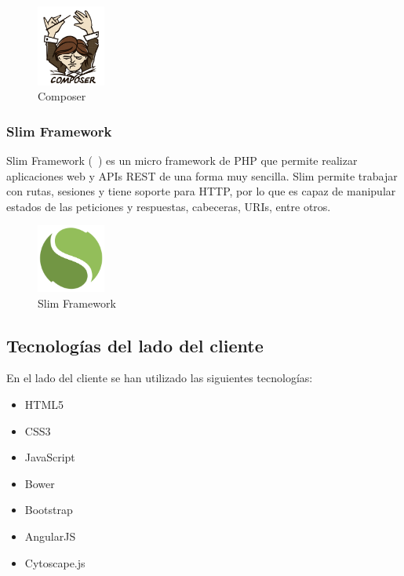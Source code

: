 \begin{figure}[tbh]
\centering
\label{fig:composer}
\includegraphics[width=0.2\textwidth]{imagenes/composer}
\caption{Composer}
\end{figure}

\subsubsection*{Slim Framework}

Slim Framework (~\cite{slim}) es un micro framework de PHP que permite realizar aplicaciones web y APIs REST de una forma muy sencilla. Slim permite trabajar con rutas, sesiones y tiene soporte para HTTP, por lo que es capaz de manipular estados de las peticiones y respuestas, cabeceras, URIs, entre otros.

\begin{figure}[tbh]
\centering
\label{fig:slim}
\includegraphics[width=0.2\textwidth]{imagenes/slim}
\caption{Slim Framework}
\end{figure}

\subsection{Tecnologías del lado del cliente}

En el lado del cliente se han utilizado las siguientes tecnologías:

\begin{itemize}
\item HTML5
\item CSS3
\item JavaScript
\item Bower
\item Bootstrap
\item AngularJS
\item Cytoscape.js
\end{itemize}

